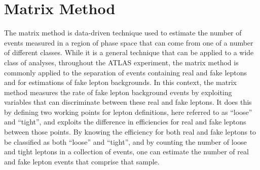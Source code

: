 
\section{Matrix Method}
\label{app:matrixmethod}

The matrix method is data-driven technique used to estimate the number of events measured in a region of phase space that can come from one of a number of different classes.
While it is a general technique that can be applied to a wide class of analyses, throughout the ATLAS experiment,
the matrix method is commonly applied to the separation of events containing real and fake leptons
and for estimations of fake lepton backgrounds. %
In this context, the matrix method measures the rate of fake lepton background events by exploiting variables that can discriminate
between these real and fake leptons.
It does this by defining two working points for lepton definitions, here referred to as ``loose'' and ``tight'',
and exploits the difference in efficiencies for real and fake leptons between those points.
By knowing the efficiency for both real and fake leptons to be classified as both ``loose'' and ``tight'',
and by counting the number of loose and tight leptons in a collection of events,
one can estimate the number of real and fake lepton events that comprise that sample.




